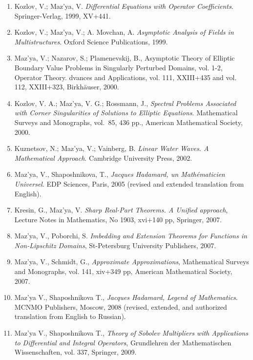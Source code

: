 \documentclass{article}
\begin{document}
\begin{enumerate}
\item Kozlov, V.;  Maz'ya, V. {\it  Differential Equations with
Operator
Coefficients}. Springer-Verlag, 1999, XV+441.

\item Kozlov, V.; Maz'ya, V.; A. Movchan, A. {\it Asymptotic Analysis
of
Fields in Multistructures}. Oxford Science Publications, 1999.

\item Maz'ya, V.; Nazarov, S.; Plamenevskij, B.,
Asymptotic Theory of Elliptic Boundary Value
Problems in Singularly Perturbed Domains, vol. 1-2, Operator Theory.
dvances and
Applications, vol. 111, XXIII+435 and vol. 112, XXIII+323,
Birkh\"auser, 2000.

\item Kozlov, V. A.; Maz'ya, V. G.; Rossmann, J.,
   {\it Spectral Problems Associated with
     Corner Singularities of Solutions to Elliptic Equations}.
     Mathematical Surveys and
       Monographs, vol.~85, 436 pp., American Mathematical Society,
2000.

\item Kuznetsov, N.; Maz'ya, V.; Vainberg, B. {\it Linear
Water Waves. A Mathematical Approach}. Cambridge University
Press, 2002.

\item Maz'ya, V., Shaposhnikova, T., 
{\it Jacques Hadamard, un Math\'ematicien Universel}. EDP Sciences, Paris, 2005 
(revised and extended translation from English).

\item Kresin, G., Maz'ya, V. 
{\it Sharp Real-Part Theorems. A Unified approach}, Lecture Notes in Mathematics, No 1903, xvi+140 pp, Springer, 2007.

\item Maz'ya, V., Poborchi, S. 
{\it Imbedding and Extension Theorems for Functions in Non-Lipschitz Domains}, St-Petersburg University Publishers, 2007.


\item Maz'ya, V., Schmidt, G., {\it Approximate Approximations}, Mathematical Surveys and Monographs, vol. 141,  xiv+349 pp, American Mathematical Society, 2007.

\item Maz'ya V., Shaposhnikova T., {\it Jacques Hadamard, Legend of  Mathematics}. MCNMO Publishers, Moscow, 2008 (revised,  extended, and  authorized translation from English to Russian).



\item Maz'ya V., Shaposhnikova T., {\it Theory of Sobolev Multipliers with Applications to Differential and Integral Operators}, Grundlehren der Mathematischen Wissenschaften, vol. 337, Springer, 2009.


\end{enumerate}
\end{document}
